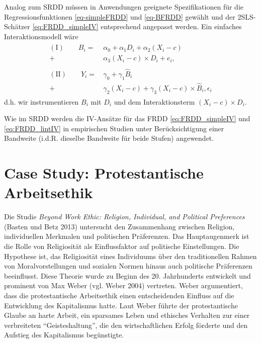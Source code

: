 \documentclass[
  a4paper,
  DIV=11,
  oneside]{scrreprt}
\begin{document}
Analog zum SRDD müssen in Anwendungen geeignete Spezifikationen für die
Regressionsfunktionen \eqref{eq-simpleFRDD} und \eqref{eq-BFRDD} gewählt
und der 2SLS-Schätzer \eqref{eq:FRDD_simpleIV} entsprechend angepasst
werden. Ein einfaches Interaktionsmodell wäre \begin{align}
  \begin{split}
  (\mathrm{I})\qquad B_i =&\, \alpha_0 + \alpha_1 D_i + \alpha_2 (X_i - c)\\ 
  +&\, \alpha_3 (X_i - c) \times D_i + e_i,\\
  \\
  (\mathrm{II})\qquad Y_i =&\, \gamma_0 + \gamma_1 \widehat{B}_i\\
  +&\, \gamma_2 (X_i - c) + \gamma_3 (X_i-c)\times\widehat{B}_i, \epsilon_i
  \end{split}\label{eq:FRDD_lintIV}
\end{align} d.h. wir instrumentieren \(B_i\) mit \(D_i\) und dem
Interaktionsterm \((X_i-c)\times D_i\).

Wie im SRDD werden die IV-Ansätze für das FRDD \eqref{eq:FRDD_simpleIV}
und \eqref{eq:FRDD_lintIV} in empirischen Studien unter Berücksichtigung
einer Bandweite (i.d.R. dieselbe Bandweite für beide Stufen) angewendet.

\hypertarget{case-study-protestantische-arbeitsethik}{%
\section{Case Study: Protestantische
Arbeitsethik}\label{case-study-protestantische-arbeitsethik}}

Die Studie \emph{Beyond Work Ethic: Religion, Individual, and Political
Preferences} (Basten und Betz 2013) untersucht den Zusammenhang zwischen
Religion, individuellen Merkmalen und politischen Präferenzen. Das
Hauptaugenmerk ist die Rolle von Religiosität als Einflussfaktor auf
politische Einstellungen. Die Hypothese ist, das Religiosität eines
Individuums über den traditionellen Rahmen von Moralvorstellungen und
sozialen Normen hinaus auch politische Präferenzen beeinflusst. Diese
Theorie wurde zu Beginn des 20. Jahrhunderts entwickelt und prominent
von Max Weber (vgl. Weber 2004) vertreten. Weber argumentiert, dass die
protestantische Arbeitsethik einen entscheidenden Einfluss auf die
Entwicklung des Kapitalismus hatte. Laut Weber führte der
protestantische Glaube an harte Arbeit, ein sparsames Leben und
ethisches Verhalten zur einer verbreiteten ``Geisteshaltung'', die den
wirtschaftlichen Erfolg förderte und den Aufstieg des Kapitalismus
begünstigte.
\end{document}
